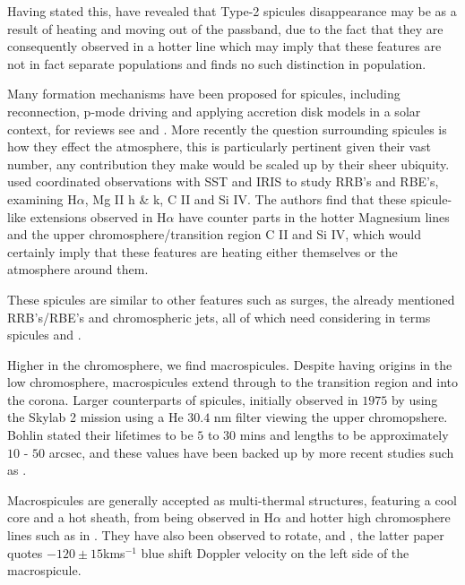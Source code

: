 \documentclass{emulateapj}
\begin{document}
Having stated this, \cite{Pereira2014} have revealed that Type-2 spicules disappearance may be as a result of heating and moving out of the passband, due to the fact that they are consequently observed in a hotter line which may imply that these features are not in fact separate populations and \cite{Zhang2012} finds no such distinction in population.

Many formation mechanisms have been proposed for spicules, including reconnection, p-mode driving and applying accretion disk models in a solar context, for reviews see \cite{Sterling2000} and \cite{Zaqara_Erdelyi2009}.
More recently the question surrounding spicules is how they effect the atmosphere, this is particularly pertinent given their vast number, any contribution they make would be scaled up by their sheer ubiquity.
\cite{Rouppe2015} used coordinated observations with SST and IRIS to study RRB's and RBE's, examining H$\alpha$, Mg II h \& k, C II and Si IV.
The authors find that these spicule-like extensions observed in H$\alpha$ have counter parts in the hotter Magnesium lines and the upper chromosphere/transition region C II and Si IV, which would certainly imply that these features are heating either themselves or the atmosphere around them.

These spicules are similar to other features such as surges, the already mentioned RRB's/RBE's and chromospheric jets, all of which need considering in terms spicules \citep{Tsiropoula2012} and \citep{Kuridze2015}.


Higher in the chromosphere, we find macrospicules.
Despite having origins in the low chromosphere, macrospicules extend through to the transition region and into the corona. 
Larger counterparts of spicules, initially observed in $1975$ by \cite{Bohlin1975} using the Skylab 2 mission using a He $30.4$ nm filter viewing the upper chromopshere.
Bohlin stated their lifetimes to be $5$ to $30$ mins and lengths to be approximately $10$ - $50$ arcsec, and these values have been backed up by more recent studies such as \cite{Bennett2015}.

Macrospicules are generally accepted as multi-thermal structures, featuring a cool core and a hot sheath, from being observed in H$\alpha$ \citep{LaBonte79} and hotter high chromosphere lines such as in \cite{Parenti2002}.
They have also been observed to rotate, \cite{Pike_Mason1998} and \cite{Kamio2010}, the latter paper quotes $-120 \pm 15$kms$^{-1}$ blue shift Doppler velocity on the left side of the macrospicule. 
\end{document}
